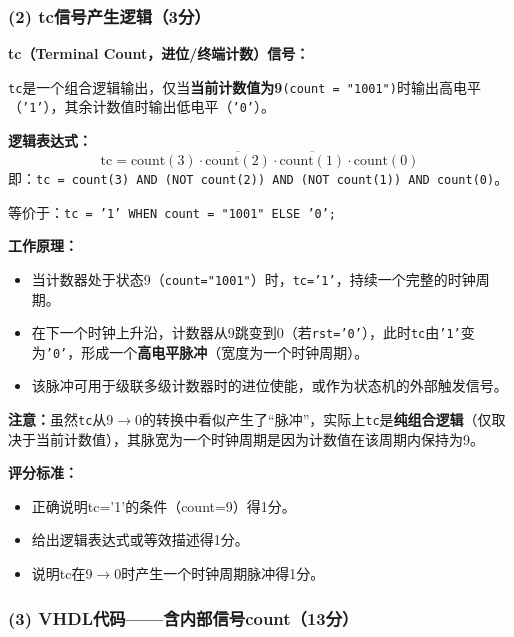 
\subsubsection*{(2) tc信号产生逻辑（3分）}

\noindent\textbf{tc（Terminal Count，进位/终端计数）信号：}

\texttt{tc}是一个组合逻辑输出，仅当\textbf{当前计数值为9}\texttt{(count = "1001")}时输出高电平（\texttt{'1'}），其余计数值时输出低电平（\texttt{'0'}）。

\medskip
\noindent\textbf{逻辑表达式：}
\[
\text{tc} = \text{count}(3) \cdot \overline{\text{count}(2)} \cdot \overline{\text{count}(1)} \cdot \text{count}(0)
\]
即：\texttt{tc = count(3) AND (NOT count(2)) AND (NOT count(1)) AND count(0)}。

等价于：\texttt{tc = '1' WHEN count = "1001" ELSE '0';}

\medskip
\noindent\textbf{工作原理：}
\begin{itemize}
  \item 当计数器处于状态9（\texttt{count="1001"}）时，\texttt{tc='1'}，持续一个完整的时钟周期。
  \item 在下一个时钟上升沿，计数器从9跳变到0（若\texttt{rst='0'}），此时\texttt{tc}由\texttt{'1'}变为\texttt{'0'}，形成一个\textbf{高电平脉冲}（宽度为一个时钟周期）。
  \item 该脉冲可用于级联多级计数器时的进位使能，或作为状态机的外部触发信号。
\end{itemize}

\noindent\textbf{注意：}虽然\texttt{tc}从9$\to$0的转换中看似产生了“脉冲”，实际上\texttt{tc}是\textbf{纯组合逻辑}（仅取决于当前计数值），其脉宽为一个时钟周期是因为计数值在该周期内保持为9。

\medskip
\noindent\textbf{评分标准：}
\begin{itemize}
  \item 正确说明tc='1'的条件（count=9）得1分。
  \item 给出逻辑表达式或等效描述得1分。
  \item 说明tc在9$\to$0时产生一个时钟周期脉冲得1分。
\end{itemize}


\subsubsection*{(3) VHDL代码——含内部信号count（13分）}

